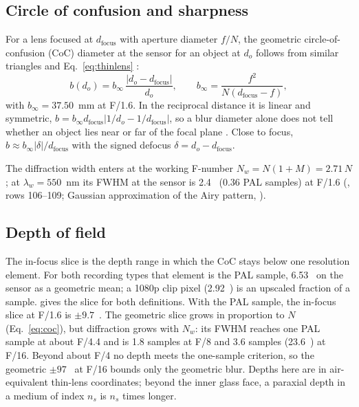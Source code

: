 \subsection{Circle of confusion and sharpness}\label{sec:coc}

For a lens focused at $d_\mathrm{focus}$ with aperture diameter $f / N$, the geometric circle-of-confusion (CoC)
diameter at the sensor for an object at $d_o$ follows from similar triangles and Eq.~\eqref{eq:thinlens}
\citep{Pentland1987}:
\begin{equation}\label{eq:coc}
b(d_o) = b_\infty \, \frac{|d_o - d_\mathrm{focus}|}{d_o}, \qquad b_\infty = \frac{f^2}{N (d_\mathrm{focus} - f)},
\end{equation}
with $b_\infty = 37.50$~mm at F/1.6. In the reciprocal distance it is linear and symmetric,
$b = b_\infty d_\mathrm{focus} |1/d_o - 1/d_\mathrm{focus}|$, so a blur diameter alone does not tell whether an object
lies near or far of the focal plane \citep{SellentFavaro2014}. Close to focus, $b \approx b_\infty |\delta| /
d_\mathrm{focus}$ with the signed defocus $\delta = d_o - d_\mathrm{focus}$.

\label{sec:psf}The diffraction width enters at the working F-number $N_w = N(1 + M) = 2.71\,N$; at $\lambda_w = 550$~nm
its FWHM at the sensor is 2.4~\um{} (0.36 PAL samples) at F/1.6 (, rows
106--109; Gaussian approximation of the Airy pattern, \citealp{ZhangZerubia2007}).

\subsection{Depth of field}\label{sec:dof}

The in-focus slice is the depth range in which the CoC stays below one resolution element. For both recording types
that element is the PAL sample, 6.53~\um{} on the sensor as a geometric mean; a 1080p clip pixel (2.92~\um) is an
upscaled fraction of a sample.  gives the slice for both definitions. With the PAL sample, the
in-focus slice at F/1.6 is $\pm 9.7$~\um. The geometric slice grows in proportion to $N$ (Eq.~\ref{eq:coc}), but diffraction grows with $N_w$: its FWHM reaches one PAL sample at about F/4.4 and is 1.8
samples at F/8 and 3.6 samples (23.6~\um) at F/16. Beyond about F/4 no depth meets the one-sample criterion, so the
geometric $\pm 97$~\um{} at F/16 bounds only the geometric blur. Depths here are in air-equivalent thin-lens
coordinates; beyond the inner glass face, a paraxial depth in a medium of index $n_s$ is $n_s$ times longer.

